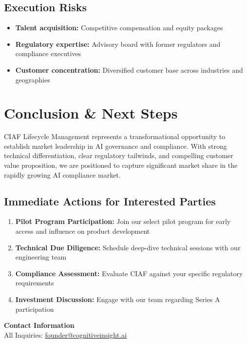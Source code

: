 \documentclass[12pt,a4paper]{article}
\begin{document}
\begin{riskbox}
\subsection{Execution Risks}
\begin{itemize}
    \item \textbf{Talent acquisition:} Competitive compensation and equity packages
    \item \textbf{Regulatory expertise:} Advisory board with former regulators and compliance executives
    \item \textbf{Customer concentration:} Diversified customer base across industries and geographies
\end{itemize}
\end{riskbox}

\section{Conclusion \& Next Steps}

CIAF Lifecycle Management represents a transformational opportunity to establish market leadership in AI governance and compliance. With strong technical differentiation, clear regulatory tailwinds, and compelling customer value proposition, we are positioned to capture significant market share in the rapidly growing AI compliance market.

\subsection{Immediate Actions for Interested Parties}

\begin{enumerate}
    \item \textbf{Pilot Program Participation:} Join our select pilot program for early access and influence on product development
    \item \textbf{Technical Due Diligence:} Schedule deep-dive technical sessions with our engineering team
    \item \textbf{Compliance Assessment:} Evaluate CIAF against your specific regulatory requirements
    \item \textbf{Investment Discussion:} Engage with our team regarding Series A participation
\end{enumerate}

\vspace{1cm}
\begin{center}
\begin{contactbox}
\centering
\textbf{Contact Information}\\
\vspace{0.5cm}
All Inquiries: \href{mailto:founder@cognitiveinsight.ai}{founder@cognitiveinsight.ai}
\end{contactbox}
\end{center}
\end{document}
